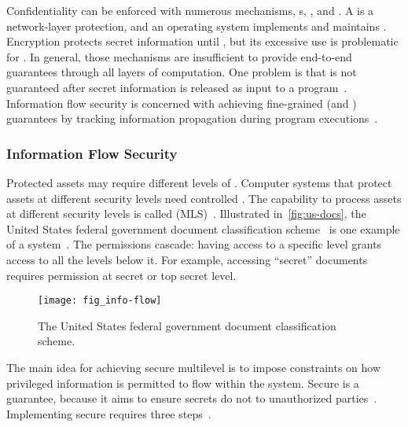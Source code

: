Confidentiality can be enforced with numerous mechanisms,
\eg {}s, , and . A
 is a network-layer protection, and an operating system implements
and maintains . Encryption protects secret
information until , but its excessive use is problematic for
. In general, those mechanisms are insufficient to provide
end-to-end guarantees through all layers of computation. One problem is that
 is not guaranteed after secret information is released as
input to a program~\cite{zdancewic2004}. Information flow security is concerned with achieving fine-grained 
(and ) guarantees by tracking information propagation during
program executions~\cite{hedin2012,eggert2014}.

\subsubsection{Information Flow Security}
\label{if-security}

Protected assets may require different levels of . Computer
systems that protect assets at different security levels need controlled
. The capability to process assets at different security
levels is called {\emph{} (MLS)}~\cite{bossi2005}.
Illustrated in~\autoref{fig:us-docs}, the United States federal government
document classification scheme~\cite{wiki_us_docs} is one example of a
 system~\cite{feiertag1977}. The permissions cascade:
having access to a specific level grants access to all the levels below it. For
example, accessing \enquote{secret} documents requires permission at secret or
top secret level.

\begin{figure}[t]
\centering
\texttt{[image: fig\_info-flow]}
\caption[Document classification scheme]
{The United States federal government document classification scheme.}
\label{fig:us-docs}
\end{figure}

The main idea for achieving secure multilevel
 is to impose constraints on how privileged information is
permitted to flow within the system. Secure  is a
 guarantee, because it aims to ensure secrets do not
 to unauthorized parties~\cite{piessens2024}. Implementing secure
 requires three steps~\cite{eggert2014}.

